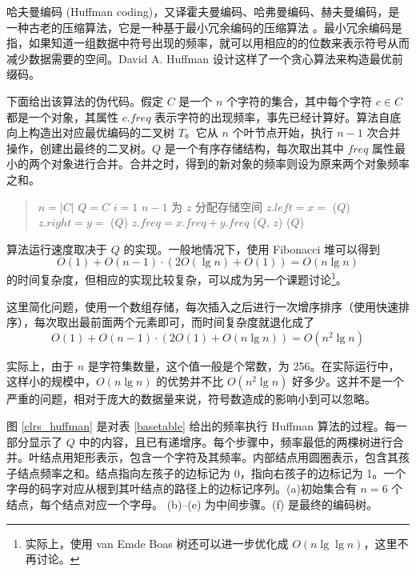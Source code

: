 哈夫曼编码 (Huffman coding)，又译霍夫曼编码、哈弗曼编码、赫夫曼编码，是一种古老的压缩算法，它是一种基于最小冗余编码的压缩算法 \cite{maic}。最小冗余编码是指，如果知道一组数据中符号出现的频率，就可以用相应的的位数来表示符号从而减少数据需要的空间。David A. Huffman \cite{huffman} 设计这样了一个贪心算法来构造最优前缀码。

下面给出该算法的伪代码。假定 $C$ 是一个 $n$ 个字符的集合，其中每个字符 $c\in C$ 都是一个对象，其属性 $c.freq$ 表示字符的出现频率，事先已经计算好。算法自底向上构造出对应最优编码的二叉树 $T$。它从 $n$ 个叶节点开始，执行 $n-1$ 次合并操作，创建出最终的二叉树。$Q$ 是一个有序存储结构，每次取出其中 $freq$ 属性最小的两个对象进行合并。合并之时，得到的新对象的频率则设为原来两个对象频率之和。

\begin{quote}
\begin{codebox}
\li $n = |C|$
\li $Q = C$
\li \For $i = 1$ \To $n-1$ \Do
\li   为 $z$ 分配存储空间
\li   $z.left = x = $ ($Q$)
\li   $z.right = y = $ ($Q$)
\li   $z.freq = x.freq + y.freq$
\li   {}($Q$, $z$)
    \End
\li \Return {}($Q$)
\label{Huffman-pc}
\end{codebox}
\end{quote}

算法运行速度取决于 $Q$ 的实现。一般地情况下，使用 Fibonacci 堆可以得到
\[ O(1) + O(n-1)\cdot (2O(\lg n) + O(1)) = O(n\lg n)\]
的时间复杂度，但相应的实现比较复杂，可以成为另一个课题讨论\footnote{实际上，使用 van Emde Boas 树还可以进一步优化成 $O(n\lg\lg n)$，这里不再讨论。}。

这里简化问题，使用一个数组存储，每次插入之后进行一次增序排序（使用快速排序），每次取出最前面两个元素即可，而时间复杂度就退化成了
\[ O(1) + O(n-1)\cdot (2O(1) + O(n\lg n)) = O(n^2\lg n)\]

实际上，由于 $n$ 是字符集数量，这个值一般是个常数，为 256。在实际运行中，这样小的规模中，$O(n\lg n)$ 的优势并不比 $O(n^2\lg n)$ 好多少。这并不是一个严重的问题，相对于庞大的数据量来说，符号数造成的影响小到可以忽略。

图 \ref{clrs_huffman} 是对表 \ref{basetable} 给出的频率执行 Huffman 算法的过程。每一部分显示了 $Q$ 中的内容，且已有递增序。每个步骤中，频率最低的两棵树进行合并。叶结点用矩形表示，包含一个字符及其频率。内部结点用圆圈表示，包含其孩子结点频率之和。结点指向左孩子的边标记为 0，指向右孩子的边标记为 1。一个字母的码字对应从根到其叶结点的路径上的边标记序列。(a)初始集合有 $n=6$ 个结点，每个结点对应一个字母。 (b)--(e) 为中间步骤。(f) 是最终的编码树。

